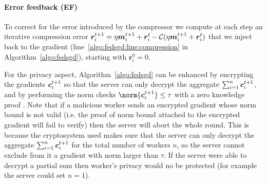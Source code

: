 \documentclass{article}
\begin{document}
\paragraph*{Error feedback (EF)} \parencite{ErrorFeedback} To correct for the error introduced by the compressor we compute at each step an iterative compression error $\bm r_i^{t+1}  = \eta \bm{m}_i^{t+1} + \bm r_i^{t} - \mathcal C(\eta \bm{m}_i^{t+1} + \bm r_i^{t})$ that we inject back to the gradient (line~\ref{algo:fedsgd:line:compression} in Algorithm~\ref{algo:fedsgd}), starting with $\bm r_i^0 = 0$. 




For the privacy aspect, Algorithm~\ref{algo:fedsgd} can be enhanced by encrypting the gradients $\bm{c}_i^{t+1}$ so that the server can only decrypt the aggregate $\textstyle\sum_{i=1}^n \bm{c}_i^{t+1}$, and by performing the norm checks $\norm{\cc_i^{t+1}} \le \tau$ with a zero knowledge proof \parencite{Rofl}. Note that if a malicious worker sends an encrypted gradient whose norm bound is not valid (i.e. the proof of norm bound attached to the encrypted gradient will fail to verify) then the server will abort the whole round. This is because the cryptosystem used makes sure that the server can only decrypt the aggregate $\textstyle\sum_{i=1}^n \bm{c}_i^{t+1}$ for the total number of workers $n$, so the server cannot exclude from it a gradient with norm larger than $\tau$. If the server were able to decrypt a partial sum then worker's privacy would no be protected (for example the server could set $n=1$).
\end{document}
